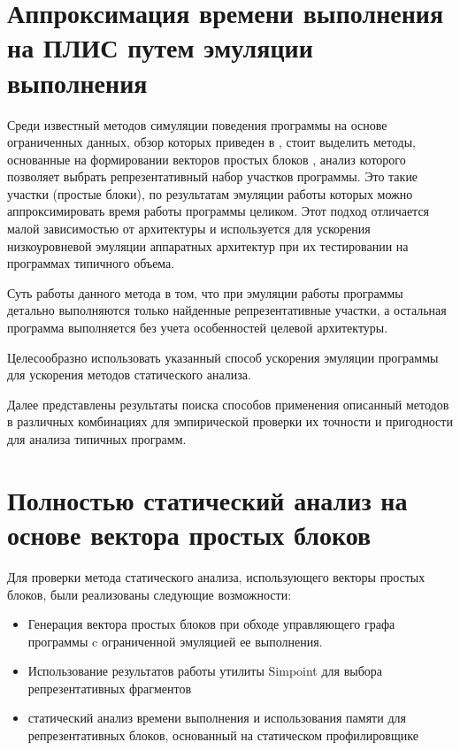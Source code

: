 \documentclass[utf8]{psta}%
\begin{document}
\section{Аппроксимация времени выполнения на ПЛИС путем эмуляции выполнения} 

Среди известный методов симуляции поведения программы на основе ограниченных данных, обзор которых приведен в \cite{JoshuaJ.Yi}, стоит выделить методы, основанные на формировании векторов простых блоков \cite{Sherwood2002}, анализ которого позволяет выбрать репрезентативный набор участков программы. Это такие участки (простые блоки), по результатам эмуляции работы которых можно аппроксимировать время работы программы целиком. Этот подход отличается малой зависимостью от архитектуры и используется для ускорения низкоуровневой эмуляции аппаратных архитектур при их тестировании на программах типичного объема.

Суть работы данного метода в том, что при эмуляции работы программы детально выполняются только найденные репрезентативные участки, а остальная программа выполняется без учета особенностей целевой архитектуры.

Целесообразно использовать указанный способ ускорения эмуляции программы  для ускорения методов статического анализа.

Далее представлены результаты поиска способов применения описанный методов в различных комбинациях для эмпирической проверки их точности и пригодности для анализа типичных программ.

\section{Полностью статический анализ на основе вектора простых блоков}

Для проверки метода статического анализа, использующего векторы простых блоков, были реализованы следующие возможности:

\begin{itemize}
    \item Генерация вектора простых блоков при обходе управляющего графа программы c ограниченной эмуляцией ее выполнения.
    \item Использование результатов работы утилиты Simpoint \cite{Simpoint2005} для выбора репрезентативных фрагментов
    \item статический анализ времени выполнения и использования памяти для репрезентативных блоков, основанный на статическом профилировщике
\end{itemize}
\end{document}
